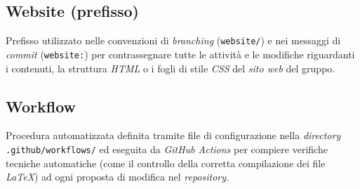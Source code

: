 \documentclass[11pt, a4paper]{article}
\begin{document}
\subsection*{Website (prefisso)}
Prefisso utilizzato nelle convenzioni di \textit{branching} (\texttt{website/}) e nei messaggi di \textit{commit} (\texttt{website:}) per contrassegnare tutte le attività e le modifiche riguardanti i contenuti, la struttura \textit{HTML} o i fogli di stile \textit{CSS} del \textit{sito web} del gruppo.

\subsection*{Workflow}
Procedura automatizzata definita tramite file di configurazione nella \textit{directory} \texttt{.github/workflows/} ed eseguita da \textit{GitHub Actions} per compiere verifiche tecniche automatiche (come il controllo della corretta compilazione dei file \textit{LaTeX}) ad ogni proposta di modifica nel \textit{repository}.
\end{document}
